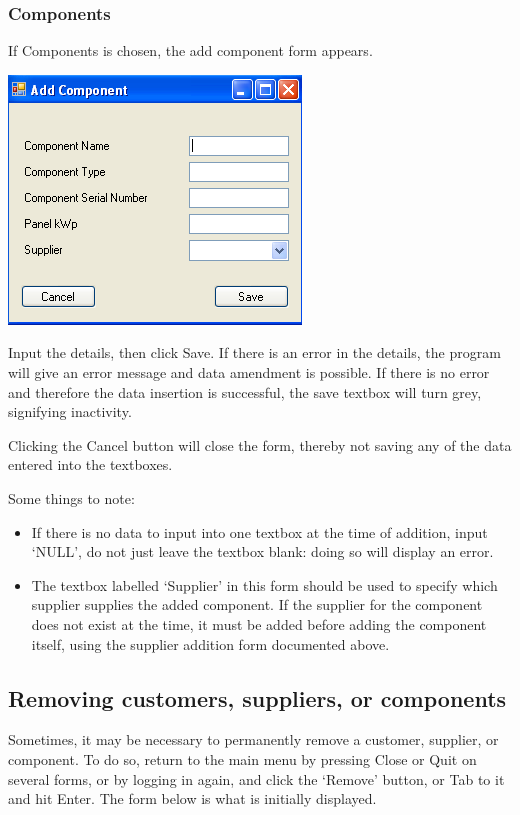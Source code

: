 		\subsubsection{Components}
		
		If Components is chosen, the add component form appears.
		
		\includegraphics[scale=0.5]{frmAddComponent_scrot}
		
		Input the details, then click Save.  If there is an error in the details, the program will give an error message and data amendment is possible.  If there is no error and therefore the data insertion is successful, the save textbox will turn grey, signifying inactivity.
		
		Clicking the Cancel button will close the form, thereby not saving any of the data entered into the textboxes.
		
		Some things to note:
		
		\begin{itemize}
			\item{If there is no data to input into one textbox at the time of addition, input `NULL', do not just leave the textbox blank: doing so will display an error.}
			\item{The textbox labelled `Supplier' in this form should be used to specify which supplier supplies the added component.  If the supplier for the component does not exist at the time, it must be added before adding the component itself, using the supplier addition form documented above.}
		\end{itemize}
		
	\subsection{Removing customers, suppliers, or components}
	
	Sometimes, it may be necessary to permanently remove a customer, supplier, or component.  To do so, return to the main menu by pressing Close or Quit on several forms, or by logging in again, and click the `Remove' button, or Tab to it and hit Enter.  The form below is what is initially displayed.
		
